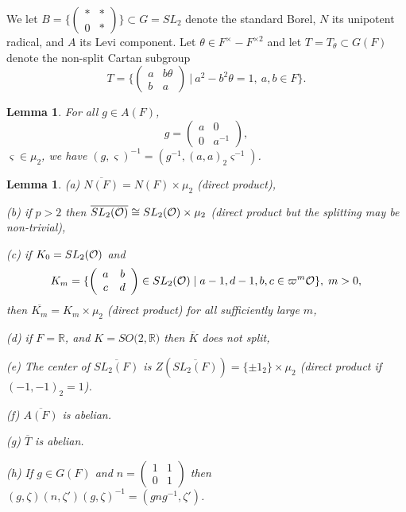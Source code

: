 \documentclass[12pt,letterpaper]{book}
\theoremstyle{plain}
\newtheorem{lemma}[theorem]{Lemma}
\theoremstyle{definition}
\theoremstyle{remark}
\theoremstyle{remark}
\begin{document}
We let $B=\{\left(
\begin{array}{cc}
\ast  & * \\
0 & *
\end{array}
\right) \}\subset G=SL_2$ denote the standard Borel, $N$ its unipotent
radical, and $A$ its Levi component. Let
$\theta\in F^\times -F^{\times 2}$ and let
$T=T_\theta\subset G(F)$ denote the non-split Cartan subgroup
\[
T=\{
    \left(
    \begin{array}{cc}
    a&b\theta\\
    b&a
    \end{array}
    \right)
    \ |\ a^2-b^2\theta =1,\ a,b\in F
  \}.
\]
\begin{lemma}\label{lem:Ainv}
For all $g\in A(F)$, 
\[
g=\left(
\begin{array}{cc}
a & 0 \\
0 & a^{-1}
\end{array}
\right) ,
\]
$\varsigma \in \mu _2$, we have $(g,\varsigma
)^{-1}=(g^{-1},(a,a)_2\varsigma ^{-1})$.
\end{lemma}

\begin{lemma}\label{lem:facts}
(a) $\overline{N(F)}=N(F)\times \mu _2$ (direct product),

(b) if $p>2$ then
$\overline{SL_2({\cal O})}\cong SL_2({\cal O})\times
\mu _2$ (direct product but the splitting may be non-trivial),

(c) if $K_0=SL_2({\cal{O}})$ and
\[
K_{m}=\{\left(
\begin{array}{cc}
a & b \\
c & d
\end{array}
\right) \in SL_2({\cal{O}})\;|\;a-1,d-1,b,c\in \varpi ^m{\cal{O}}\},
\;m>0,
\]
then $\overline{K_{m}}=K_{m}\times \mu _2$
(direct product) for all sufficiently large $m$,

(d) if $F={\mathbb {R}}$, and $K=SO(2,{\mathbb {R})}$ then
$\overline{K}$ does not split,

(e) The center of $\overline{SL_2(F)}$ is $Z(\overline{SL_2(F)})=\{\pm
1_2\}\times \mu _2$ (direct product if $(-1,-1)_2=1$).

(f) $\overline{A(F)}$ is abelian.

(g) $\overline{T}$ is abelian.

(h) If $g\in G(F)$ and
$n=
\left(
\begin{array}{cc}
1 & 1\\
0 & 1
\end{array}
\right)
$
then $(g,\zeta)(n,\zeta ')(g,\zeta)^{-1}
=(gng^{-1},\zeta')$.

\end{lemma}
\end{document}
